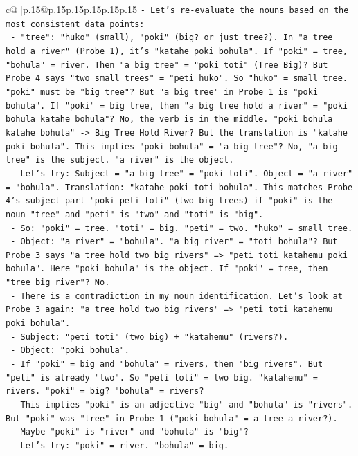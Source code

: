 \documentclass{article}
\begin{document}
{\begin{supertabular}{c@{$\;$}|p{.15\linewidth}@{}p{.15\linewidth}p{.15\linewidth}p{.15\linewidth}p{.15\linewidth}p{.15\linewidth}}
{{{\texttt{{-} Let's re{-}evaluate the nouns based on the most consistent data points:} \\
\texttt{  {-} "tree": "huko" (small), "poki" (big? or just tree?). In "a tree hold a river" (Probe 1), it's "katahe poki bohula". If "poki" = tree, "bohula" = river. Then "a big tree" = "poki toti" (Tree Big)? But Probe 4 says "two small trees" = "peti huko". So "huko" = small tree. "poki" must be "big tree"? But "a big tree" in Probe 1 is "poki bohula". If "poki" = big tree, then "a big tree hold a river" = "poki bohula katahe bohula"? No, the verb is in the middle. "poki bohula katahe bohula" {-}> Big Tree Hold River? But the translation is "katahe poki bohula". This implies "poki bohula" = "a big tree"? No, "a big tree" is the subject. "a river" is the object.} \\
\texttt{  {-} Let's try: Subject = "a big tree" = "poki toti". Object = "a river" = "bohula". Translation: "katahe poki toti bohula". This matches Probe 4's subject part "poki peti toti" (two big trees) if "poki" is the noun "tree" and "peti" is "two" and "toti" is "big".} \\
\texttt{  {-} So: "poki" = tree. "toti" = big. "peti" = two. "huko" = small tree.} \\
\texttt{  {-} Object: "a river" = "bohula". "a big river" = "toti bohula"? But Probe 3 says "a tree hold two big rivers" => "peti toti katahemu poki bohula". Here "poki bohula" is the object. If "poki" = tree, then "tree big river"? No.} \\
\texttt{  {-} There is a contradiction in my noun identification. Let's look at Probe 3 again: "a tree hold two big rivers" => "peti toti katahemu poki bohula".} \\
\texttt{    {-} Subject: "peti toti" (two big) + "katahemu" (rivers?).} \\
\texttt{    {-} Object: "poki bohula".} \\
\texttt{    {-} If "poki" = big and "bohula" = rivers, then "big rivers". But "peti" is already "two". So "peti toti" = two big. "katahemu" = rivers. "poki" = big? "bohula" = rivers?} \\
\texttt{    {-} This implies "poki" is an adjective "big" and "bohula" is "rivers". But "poki" was "tree" in Probe 1 ("poki bohula" = a tree a river?).} \\
\texttt{    {-} Maybe "poki" is "river" and "bohula" is "big"?} \\
\texttt{    {-} Let's try: "poki" = river. "bohula" = big.} \\
}}}
\end{supertabular}}
\end{document}
